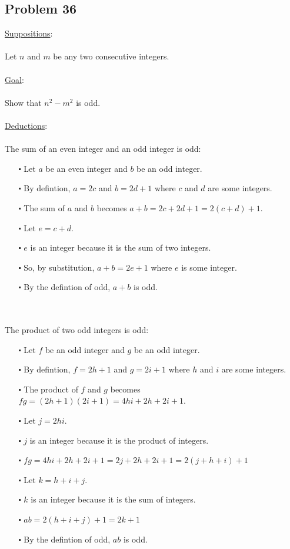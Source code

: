 \documentclass[12pt]{article}
\begin{document}
\subsection*{Problem 36}
\underline{Suppositions}:
\\ \\
Let $n$ and $m$ be any two consecutive integers. 
\\ \\
\underline{Goal}:
\\ \\
Show that $n^2 - m^2$ is odd.
\\ \\
\underline{Deductions}:
\\ \\
The sum of an even integer and an odd integer is odd:
\begin{itemize}
  \item [$\centerdot$] Let $a$ be an even integer and $b$ be an odd integer.
  \item [$\centerdot$] By defintion, $a = 2c$ and $b = 2d+1$ where $c$ and $d$ are some integers.
  \item [$\centerdot$] The sum of $a$ and $b$ becomes $a+b = 2c+2d+1 = 2(c+d) + 1$.
  \item [$\centerdot$] Let $e = c + d$.
  \item [$\centerdot$] $e$ is an integer because it is the sum of two integers.
  \item [$\centerdot$] So, by substitution, $a+b = 2e+1$ where $e$ is some integer.
  \item [$\centerdot$] By the defintion of odd, $a+b$ is odd.
\end{itemize}
\newblock
\\ \\
The product of two odd integers is odd:
\begin{itemize}
  \item [$\centerdot$] Let $f$ be an odd integer and $g$ be an odd integer.
  \item [$\centerdot$] By defintion, $f = 2h+1$ and $g = 2i+1$ where $h$ and $i$ are some integers.
  \item [$\centerdot$] The product of $f$ and $g$ becomes $fg = (2h+1)(2i+1) = 4hi + 2h + 2i + 1$.
  \item [$\centerdot$] Let $j = 2hi$.
  \item [$\centerdot$] $j$ is an integer because it is the product of integers.
  \item [$\centerdot$] $fg = 4hi + 2h + 2i + 1 = 2j + 2h + 2i + 1 = 2(j+h+i)+1$
  \item [$\centerdot$] Let $k = h+i+j$.
  \item [$\centerdot$] $k$ is an integer because it is the sum of integers.
  \item [$\centerdot$] $ab = 2(h+i+j)+1 = 2k+1$
  \item [$\centerdot$] By the defintion of odd, $ab$ is odd.
\end{itemize}
\end{document}
